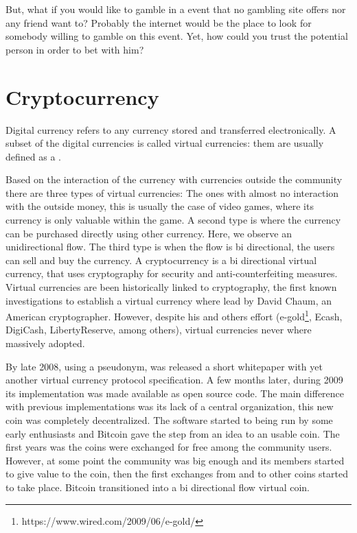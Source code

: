 But, what if you would like to gamble in a event that no gambling site offers
  nor any friend want to? Probably the internet would be the place to look for
  somebody willing to gamble on this event. Yet, how could you trust the
  potential person in order to bet with him?

\section{Cryptocurrency}
Digital currency refers to any currency stored and transferred
  electronically.
  A subset of the digital currencies is called virtual currencies: them are
  usually defined\cite{bcentraleuro} as a .

Based on the interaction of the currency with currencies outside the
  community there are three types of virtual currencies: The ones with almost
  no interaction with the outside money, this is usually the case of video
  games, where its currency is only valuable within the game. A second
  type is where the currency can be purchased directly using other currency.
  Here, we observe an unidirectional flow. The third type is when the flow is
  bi directional, the users can sell and buy the currency.
A cryptocurrency is a bi directional virtual currency, that uses cryptography
  for security and anti-counterfeiting measures. Virtual currencies are been
  historically linked to cryptography, the first known investigations
  \cite{chaum1983blind} to establish a virtual currency where lead by David
  Chaum, an American cryptographer. However, despite his and others effort
  (e-gold\footnote{https://www.wired.com/2009/06/e-gold/},
  Ecash\cite{chaum1990untraceable},
  DigiCash, LibertyReserve, among others), virtual currencies never where
  massively adopted.

By late 2008, using a pseudonym, was released a short
  whitepaper\cite{nakamoto2008bitcoin} with yet another virtual currency
  protocol specification. A few months later, during 2009 its implementation
  was made available as open source code. The main difference with previous
  implementations was its lack of a central organization, this new coin was
  completely decentralized. The software started to being run by some early
  enthusiasts and Bitcoin gave the step from an idea to an usable coin. The
  first years was the coins were exchanged for free among the community users.
  However, at some point the community was big enough and its members started
  to give value to the coin, then the first exchanges from and to other coins
  started to take place. Bitcoin transitioned into a bi directional flow
  virtual coin.

